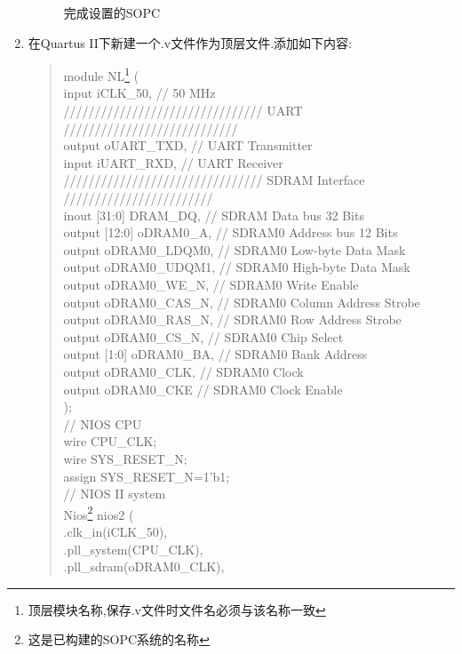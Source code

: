 \documentclass[12pt,a4paper,titlepage]{article}
\begin{document}
\begin{enumerate}
\begin{figure}[!bthp]
\caption{完成设置的SOPC\label{f_sopc}}
\end{figure}
\item 在Quartus II下新建一个.v文件作为顶层文件.添加如下内容:
\begin{verse}
module NL\footnote{顶层模块名称,保存.v文件时文件名必须与该名称一致} (\\
  input         iCLK\_50,        // 50 MHz\\
  //////////////////////////////// UART ////////////////////////////\\
  output        oUART\_TXD,      // UART Transmitter\\
  input         iUART\_RXD,      // UART Receiver\\
  //////////////////////////////// SDRAM Interface ////////////////////////\\
  inout  [31:0] DRAM\_DQ,        // SDRAM Data bus 32 Bits\\
  output [12:0] oDRAM0\_A,       // SDRAM0 Address bus 12 Bits\\
  output        oDRAM0\_LDQM0,   // SDRAM0 Low-byte Data Mask \\
  output        oDRAM0\_UDQM1,   // SDRAM0 High-byte Data Mask\\
  output        oDRAM0\_WE\_N,    // SDRAM0 Write Enable\\
  output        oDRAM0\_CAS\_N,   // SDRAM0 Column Address Strobe\\
  output        oDRAM0\_RAS\_N,   // SDRAM0 Row Address Strobe\\
  output        oDRAM0\_CS\_N,    // SDRAM0 Chip Select\\
  output [1:0]  oDRAM0\_BA,      // SDRAM0 Bank Address\\
  output        oDRAM0\_CLK,     // SDRAM0 Clock\\
  output        oDRAM0\_CKE      // SDRAM0 Clock Enable\\
);\\
// NIOS CPU\\
wire CPU\_CLK;\\
wire SYS\_RESET\_N;\\
assign SYS\_RESET\_N=1'b1;\\
// NIOS II system\\
Nios\footnote{这是已构建的SOPC系统的名称} nios2 (\\
.clk\_in(iCLK\_50),\\
.pll\_system(CPU\_CLK),\\
.pll\_sdram(oDRAM0\_CLK),\\

\end{verse}
\end{enumerate}
\end{document}
